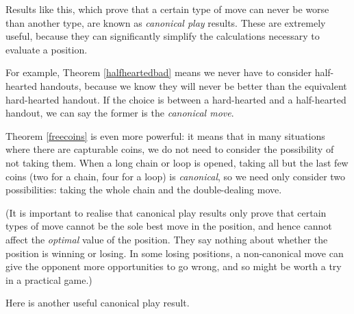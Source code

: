 \documentclass[a4paper,twocolumn]{article}
\begin{document}
Results like this, which prove that a certain type of move can never
be worse than another type, are known as \emph{canonical play}
results. These are extremely useful, because they can significantly
simplify the calculations necessary to evaluate a position.

For example, Theorem \ref{halfheartedbad} means we never have to
consider half-hearted handouts, because we know they will never be
better than the equivalent hard-hearted handout. If the choice is
between a hard-hearted and a half-hearted handout, we can say the
former is the \emph{canonical move}.

Theorem \ref{freecoins} is even more powerful: it means that in many
situations where there are capturable coins, we do not need to
consider the possibility of not taking them. When a long chain or loop
is opened, taking all but the last few coins (two for a chain, four
for a loop) is \emph{canonical}, so we need only consider two
possibilities: taking the whole chain and the double-dealing move.

(It is important to realise that canonical play results only prove
that certain types of move cannot be the sole best move in the
position, and hence cannot affect the \emph{optimal} value of the
position. They say nothing about whether the position is winning or
losing. In some losing positions, a non-canonical move can give the
opponent more opportunities to go wrong, and so might be worth a try
in a practical game.)

Here is another useful canonical play result.
\end{document}
